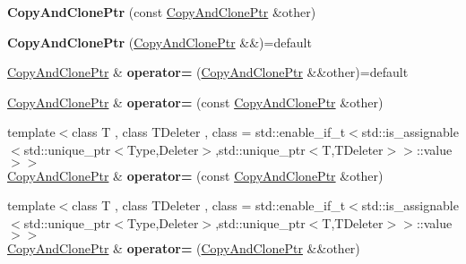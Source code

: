 \begin{DoxyCompactItemize}
\item 
\hypertarget{classSpacy_1_1CopyAndClonePtr_a178170b0fe64ab2f2be9feacbe5542eb}{}{\bfseries Copy\+And\+Clone\+Ptr} (const \hyperlink{classSpacy_1_1CopyAndClonePtr}{Copy\+And\+Clone\+Ptr} \&other)\label{classSpacy_1_1CopyAndClonePtr_a178170b0fe64ab2f2be9feacbe5542eb}

\item 
\hypertarget{classSpacy_1_1CopyAndClonePtr_aca2912cadda765fa65dbbdd8a94a424a}{}{\bfseries Copy\+And\+Clone\+Ptr} (\hyperlink{classSpacy_1_1CopyAndClonePtr}{Copy\+And\+Clone\+Ptr} \&\&)=default\label{classSpacy_1_1CopyAndClonePtr_aca2912cadda765fa65dbbdd8a94a424a}

\item 
\hypertarget{classSpacy_1_1CopyAndClonePtr_af45cf245e242fbac76feef4ed09c1310}{}\hyperlink{classSpacy_1_1CopyAndClonePtr}{Copy\+And\+Clone\+Ptr} \& {\bfseries operator=} (\hyperlink{classSpacy_1_1CopyAndClonePtr}{Copy\+And\+Clone\+Ptr} \&\&other)=default\label{classSpacy_1_1CopyAndClonePtr_af45cf245e242fbac76feef4ed09c1310}

\item 
\hypertarget{classSpacy_1_1CopyAndClonePtr_a11b309df0a471a35a4ec0ea8bcbf5806}{}\hyperlink{classSpacy_1_1CopyAndClonePtr}{Copy\+And\+Clone\+Ptr} \& {\bfseries operator=} (const \hyperlink{classSpacy_1_1CopyAndClonePtr}{Copy\+And\+Clone\+Ptr} \&other)\label{classSpacy_1_1CopyAndClonePtr_a11b309df0a471a35a4ec0ea8bcbf5806}

\item 
\hypertarget{classSpacy_1_1CopyAndClonePtr_afe20694fe403f704479627463d02ffe8}{}{\footnotesize template$<$class T , class T\+Deleter , class  = std\+::enable\+\_\+if\+\_\+t$<$std\+::is\+\_\+assignable$<$std\+::unique\+\_\+ptr$<$\+Type,\+Deleter$>$,std\+::unique\+\_\+ptr$<$\+T,\+T\+Deleter$>$$>$\+::value$>$$>$ }\\\hyperlink{classSpacy_1_1CopyAndClonePtr}{Copy\+And\+Clone\+Ptr} \& {\bfseries operator=} (const \hyperlink{classSpacy_1_1CopyAndClonePtr}{Copy\+And\+Clone\+Ptr} \&other)\label{classSpacy_1_1CopyAndClonePtr_afe20694fe403f704479627463d02ffe8}

\item 
\hypertarget{classSpacy_1_1CopyAndClonePtr_a02200895f1cac7f8aa0fa016897b2a1d}{}{\footnotesize template$<$class T , class T\+Deleter , class  = std\+::enable\+\_\+if\+\_\+t$<$std\+::is\+\_\+assignable$<$std\+::unique\+\_\+ptr$<$\+Type,\+Deleter$>$,std\+::unique\+\_\+ptr$<$\+T,\+T\+Deleter$>$$>$\+::value$>$$>$ }\\\hyperlink{classSpacy_1_1CopyAndClonePtr}{Copy\+And\+Clone\+Ptr} \& {\bfseries operator=} (\hyperlink{classSpacy_1_1CopyAndClonePtr}{Copy\+And\+Clone\+Ptr} \&\&other)\label{classSpacy_1_1CopyAndClonePtr_a02200895f1cac7f8aa0fa016897b2a1d}


\end{DoxyCompactItemize}
